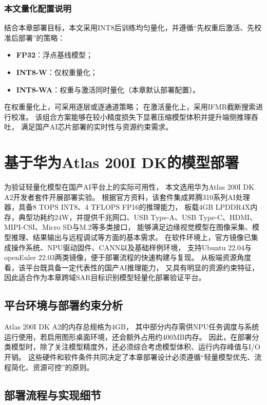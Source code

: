 \subsubsection{本文量化配置说明}

结合本章部署目标，本文采用INT8后训练均匀量化，并遵循“先权重后激活、先校准后部署”的策略：
\begin{itemize}[nosep,leftmargin=*]
	\item \textbf{FP32}：浮点基线模型；
	\item \textbf{INT8-W}：仅权重量化；
	\item \textbf{INT8-WA}：权重与激活同时量化（本章默认部署配置）。
\end{itemize}

在权重量化上，可采用逐层或逐通道策略；
在激活量化上，采用IFMR截断搜索进行校准。
该组合方案能够在较小精度损失下显著压缩模型体积并提升端侧推理吞吐，
满足国产AI芯片部署的实时性与资源约束需求。



\section{基于华为Atlas 200I DK的模型部署}

为验证轻量化模型在国产AI平台上的实际可用性，
本文选用华为Atlas 200I DK A2开发者套件开展部署实验。
根据官方资料，该套件集成昇腾310系列AI处理器，具备8 TOPS INT8、4 TFLOPS FP16的推理能力，
板载4GB LPDDR4X内存，典型功耗约24W，并提供千兆网口、USB Type-A、USB Type-C、HDMI、MIPI-CSI、Micro SD与M.2等多类接口，
能够满足边缘视觉模型在图像采集、模型推理、结果输出与远程调试等方面的基本需求。
在软件环境上，官方镜像已集成操作系统、NPU驱动固件、CANN以及基础样例环境，
支持Ubuntu 22.04与openEuler 22.03两类镜像，便于部署流程的快速构建与复现。
从板端资源角度看，该平台既具备一定代表性的国产AI推理能力，
又具有明显的资源约束特征，因此适合作为本章跨域SAR目标识别模型轻量化部署验证平台。

\subsection{平台环境与部署约束分析}

Atlas 200I DK A2的内存总规格为4GB，
其中部分内存需供NPU任务调度与系统运行使用，若启用图形桌面环境，还会额外占用约400MB内存。
因此，在部署分类模型时，除了关注模型精度外，还必须综合考虑模型体积、运行内存峰值与I/O开销。
这些硬件和软件条件共同决定了本章部署设计必须遵循“轻量模型优先、流程简化、资源可控”的原则。

\subsection{部署流程与实现细节}

